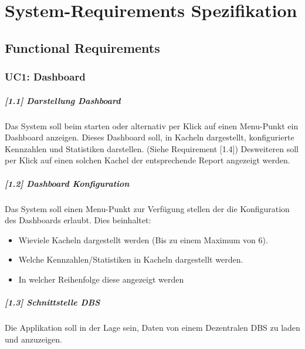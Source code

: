 \documentclass[a4paper]{scrreprt}
\begin{document}
\chapter{System-Requirements Spezifikation}

\section{Functional Requirements}
\subsection{UC1: Dashboard}
\paragraph{[1.1] Darstellung Dashboard}
Das System soll beim starten oder alternativ per Klick auf einen Menu-Punkt ein Dashboard anzeigen. Dieses Dashboard soll, in Kacheln dargestellt, konfigurierte Kennzahlen und Statistiken darstellen. (Siehe Requirement [1.4]) Desweiteren soll per Klick auf einen solchen Kachel der entsprechende Report angezeigt werden. 
 	
\paragraph{[1.2] Dashboard Konfiguration}
Das System soll einen Menu-Punkt zur Verfügung stellen der die Konfiguration des Dashboards erlaubt. Dies beinhaltet: 
\begin{itemize}
\item Wieviele Kacheln dargestellt werden (Bis zu einem Maximum von 6).\\
\item Welche Kennzahlen/Statistiken in Kacheln dargestellt werden.\\
\item In welcher Reihenfolge diese angezeigt werden\\
\end{itemize}

\paragraph{[1.3] Schnittstelle DBS}
Die Applikation soll in der Lage sein, Daten von einem Dezentralen DBS zu laden und anzuzeigen. 
\end{document}
